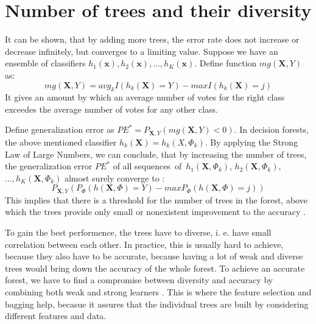 \documentclass[thesis=B,english]{FITthesis}[2012/10/20]
\begin{document}
	\section{Number of trees and their diversity}
	It can be shown, that by adding more trees, the error rate does not increase or decrease infinitely, but converges to a limiting value. Suppose we have an ensemble of classifiers \(h_1(\textbf{x}), h_2(\textbf{x}),\dots,h_K(\textbf{x})\). Define function \(\textit{mg}(\mathbf{X},Y)\) as:
	\[\textit{mg}(\mathbf{X},Y)=\textit{avg}_kI(h_k(\mathbf{X})=Y)-\textit{max}I(h_k(\mathbf{X})=j)\] It gives an amount by which an average number of votes for the right class exceedes the average number of votes for any other class. 

	Define generalization error as \(PE^*=P_{\mathbf{X},Y}(\textit{mg}(\mathbf{X},Y) < 0)\). In decision forests, the above mentioned classifier \(h_k(\textbf{X})=h_k(X, \Phi_k)\). By applying the Strong Law of Large Numbers, we can conclude, that by increasing the number of trees, the generalization error \(PE^*\) of all sequences~of~\(h_1(\mathbf{X},\Phi_k)\), \(h_2(\mathbf{X}, \Phi_k)\),~\(\dots, h_K(\mathbf{X}, \Phi_k)\) almost surely converge to \cite{BR01}:
	\[
	P_{\mathbf{X},Y}(P_{\Phi}(h(\mathbf{X}, \Phi)=Y)-\textit{max}P_{\Phi}(h(\mathbf{X}, \Phi)=j))
	\]
	This implies that there is a threshold for the number of trees in the forest, above which the trees provide only small or nonexistent improvement to the accuracy \cite{SELECTION_OF_DT}.
	
	To gain the best performence, the trees have to diverse, i. e. have small correlation between each other. In practice, this is usually hard to achieve, because they also have to be accurate, because having a lot of weak and diverse trees would bring down the accuracy of the whole forest. To achieve an accurate forest, we have to find a compromise between diversity and accuracy by combining both weak and strong learners \cite{ENSEMBLE}. This is where the feature selection and bagging help, becasue it assures that the individual trees are built by considering different features and data.
\end{document}
